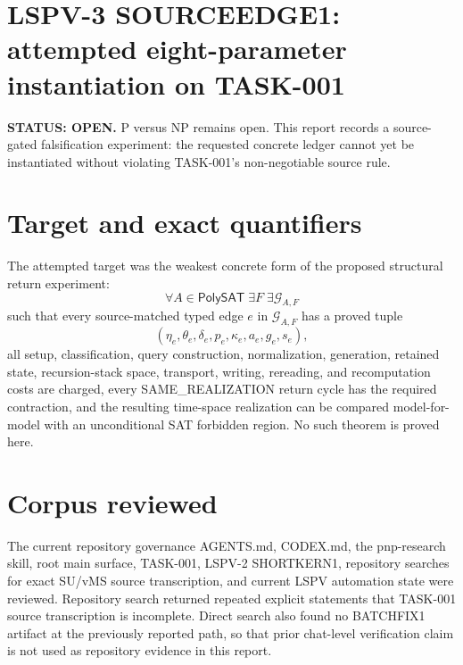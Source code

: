 \documentclass[11pt]{article}
\begin{document}
\section*{LSPV-3 SOURCEEDGE1: attempted eight-parameter instantiation on TASK-001}
\textbf{STATUS: OPEN.} P versus NP remains open. This report records a source-gated falsification experiment: the requested concrete ledger cannot yet be instantiated without violating TASK-001's non-negotiable source rule.

\section*{Target and exact quantifiers}
The attempted target was the weakest concrete form of the proposed structural return experiment:
\[
\forall A\in\mathsf{PolySAT}\;\exists F\;\exists\mathcal G_{A,F}
\]
such that every source-matched typed edge \(e\) in \(\mathcal G_{A,F}\) has a proved tuple
\[
(\eta_e,\theta_e,\delta_e,p_e,\kappa_e,a_e,g_e,s_e),
\]
all setup, classification, query construction, normalization, generation, retained state, recursion-stack space, transport, writing, rereading, and recomputation costs are charged, every SAME\_REALIZATION return cycle has the required contraction, and the resulting time-space realization can be compared model-for-model with an unconditional SAT forbidden region. No such theorem is proved here.

\section*{Corpus reviewed}
The current repository governance AGENTS.md, CODEX.md, the pnp-research skill, root main surface, TASK-001, LSPV-2 SHORTKERN1, repository searches for exact SU/vMS source transcription, and current LSPV automation state were reviewed. Repository search returned repeated explicit statements that TASK-001 source transcription is incomplete. Direct search also found no BATCHFIX1 artifact at the previously reported path, so that prior chat-level verification claim is not used as repository evidence in this report.
\end{document}
